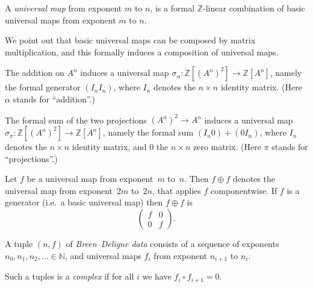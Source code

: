 \begin{definition}
  \label{universal_map}
  \leanok
  A \emph{universal map} from exponent $m$ to $n$,
  is a formal $\mathbb Z$-linear combination of basic universal maps from exponent $m$ to $n$.
\end{definition}

We point out that basic universal maps can be composed by matrix multiplication,
and this formally induces a composition of universal maps.

\begin{definition}
  \label{sigma_add}
  \leanok
  The addition on $A^n$ induces a universal map
  $\sigma_\alpha \colon \mathbb Z[(A^n)^2] \to \mathbb Z[A^n]$,
  namely the formal generator $(I_n I_n)$, where $I_n$ denotes the $n \times n$ identity matrix.
  (Here $\alpha$ stands for ``addition''.)
\end{definition}

\begin{definition}
  \label{sigma_proj}
  \leanok
  The formal sum of the two projections $(A^n)^2 \to A^n$
  induces a universal map $\sigma_\pi \colon \mathbb Z[(A^n)^2] \to \mathbb Z[A^n]$,
  namely the formal sum $(I_n 0) + (0 I_n)$,
  where $I_n$ denotes the $n \times n$ identity matrix, and $0$ the $n \times n$ zero matrix.
  (Here $\pi$ stands for ``projections''.)
\end{definition}

\begin{definition}
  \label{BD_double}
  \leanok
  Let $f$ be a universal map from exponent~$m$ to~$n$.
  Then $f \oplus f$ denotes the universal map from exponent~$2m$ to~$2n$,
  that applies $f$ componentwise.
  If $f$ is a generator (i.e.\ a basic universal map)
  then $f \oplus f$ is
  \[
    \begin{pmatrix}
    f & 0 \\
    0 & f
    \end{pmatrix}.
  \]
\end{definition}

\begin{definition}
  \label{BD_data}
  \leanok
  A tuple $(n, f)$ of \emph{Breen--Deligne data}
  consists of a sequence of exponents $n_0, n_1, n_2, \dots \in \mathbb N$,
  and universal maps $f_i$ from exponent $n_{i+1}$ to $n_i$.

  Such a tuples is a \emph{complex} if for all $i$ we have $f_i \circ f_{i+1} = 0$.
\end{definition}

